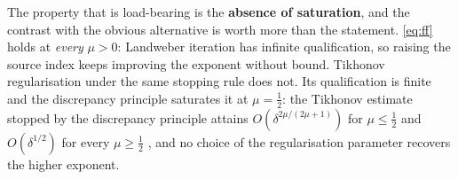 \begin{remark}
\smallskip
 The property that is load-bearing is the \textbf{absence of saturation}, and the contrast with
the obvious alternative is worth more than the statement. \eqref{eq:ff} holds at \emph{every} $\mu>0$:
Landweber iteration has infinite qualification, so raising the source index keeps improving the
exponent without bound. Tikhonov regularisation under the same stopping rule does not. Its
qualification is finite and the discrepancy principle saturates it at $\mu=\tfrac12$: the Tikhonov
estimate stopped by the discrepancy principle attains $O(\delta^{2\mu/(2\mu+1)})$ for
$\mu\le\tfrac12$ and $O(\delta^{1/2})$ for every $\mu\ge\tfrac12$ \citep[Rem.~4.21]{engl2000}, and no
choice of the regularisation parameter recovers the higher exponent.
%

\end{remark}
